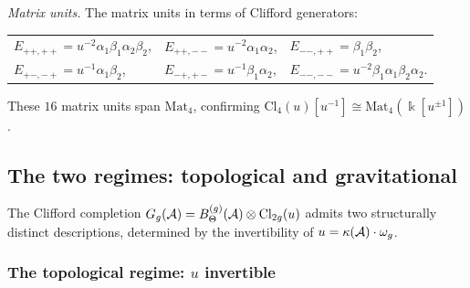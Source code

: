 \emph{Matrix units.}\;
The matrix units in terms of Clifford generators:
\begin{center}
\renewcommand{\arraystretch}{1.2}
\begin{tabular}{lll}
$E_{++,++} = u^{-2}\alpha_1\beta_1\alpha_2\beta_2$, &
$E_{++,--} = u^{-2}\alpha_1\alpha_2$, &
$E_{--,++} = \beta_1\beta_2$, \\
$E_{+-,-+} = u^{-1}\alpha_1\beta_2$, &
$E_{-+,+-} = u^{-1}\beta_1\alpha_2$, &
$E_{--,--} = u^{-2}\beta_1\alpha_1\beta_2\alpha_2$.
\end{tabular}
\end{center}
These $16$ matrix units span $\mathrm{Mat}_4$, confirming
$\mathrm{Cl}_4(u)[u^{-1}] \cong \mathrm{Mat}_4(\Bbbk[u^{\pm 1}])$.

%
%

\subsection{The two regimes: topological and gravitational}
\label{subsec:two-regimes}

The Clifford completion $G_g(\mathcal{A}) = B_\Theta^{(g)}(\mathcal{A}) \otimes
\mathrm{Cl}_{2g}(u)$ admits two structurally distinct
descriptions, determined by the invertibility of
$u = \kappa(\mathcal{A}) \cdot \omega_g$.

\subsubsection{The topological regime: $u$ invertible}
\label{subsubsec:topological-regime}

